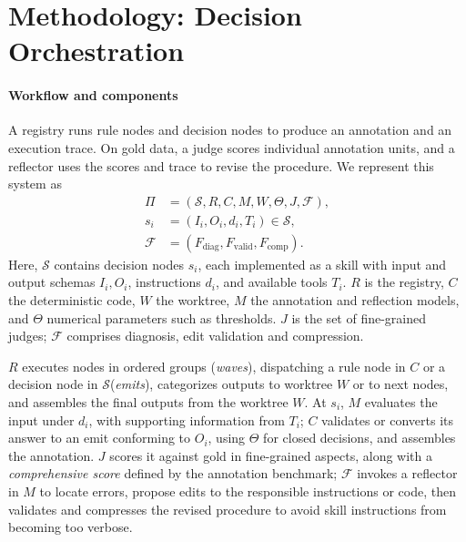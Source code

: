 \section{Methodology: Decision Orchestration}
\label{sec:method}

\paragraph{Workflow and components}
A registry runs rule nodes and decision nodes to produce an annotation and an execution trace. On gold data, a judge scores individual annotation units, and a reflector uses the scores and trace to revise the procedure. We represent this system as
\begin{equation}
\label{eq:procedure}
\begin{aligned}
\Pi &= (\mathcal{S}, R, C, M, W, \Theta, J, \mathcal{F}),\\
s_i &= (I_i,O_i,d_i,T_i)\in\mathcal{S},\\
\mathcal{F} &= (F_{\mathrm{diag}},F_{\mathrm{valid}},F_{\mathrm{comp}}).
\end{aligned}
\end{equation}
Here, $\mathcal{S}$ contains decision nodes $s_i$, each implemented as a skill with input and output schemas $I_i,O_i$, instructions $d_i$, and available tools $T_i$. $R$ is the registry, $C$ the deterministic code, $W$ the worktree, $M$ the annotation and reflection models, and $\Theta$ numerical parameters such as thresholds. $J$ is the set of fine-grained judges; $\mathcal{F}$ comprises diagnosis, edit validation and compression.

$R$ executes nodes in ordered groups (\emph{waves}), dispatching a rule node in $C$ or a decision node in $\mathcal{S}$(\emph{emits}), categorizes outputs to worktree $W$ or to next nodes, and assembles the final outputs from the worktree $W$. At $s_i$, $M$ evaluates the input under $d_i$, with supporting information from $T_i$; $C$ validates or converts its answer to an emit conforming to $O_i$, using $\Theta$ for closed decisions, and assembles the annotation. $J$ scores it against gold in fine-grained aspects, along with a \textit{comprehensive score} defined by the annotation benchmark; $\mathcal{F}$ invokes a reflector in $M$ to locate errors, propose edits to the responsible instructions or code, then validates and compresses the revised procedure to avoid skill instructions from becoming too verbose.

